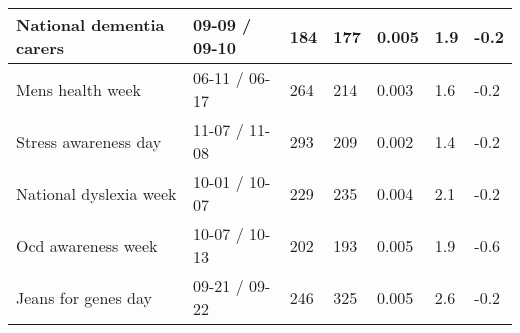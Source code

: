 \begin{tabularx}{\textwidth}{|X|P{2.2cm}|P{1.2cm}|P{1cm}|P{1.4cm}|P{1.2cm}|P{1.3cm}|}
National dementia carers & 09-09 / 09-10 & 184 & 177 & 0.005 & 1.9 & -0.2 \\ \hline
Mens health week & 06-11 / 06-17 & 264 & 214 & 0.003 & 1.6 & -0.2 \\ \hline
Stress awareness day & 11-07 / 11-08 & 293 & 209 & 0.002 & 1.4 & -0.2 \\ \hline
National dyslexia week & 10-01 / 10-07 & 229 & 235 & 0.004 & 2.1 & -0.2 \\ \hline
Ocd awareness week & 10-07 / 10-13 & 202 & 193 & 0.005 & 1.9 & -0.6 \\ \hline
Jeans for genes day & 09-21 / 09-22 & 246 & 325 & 0.005 & 2.6 & -0.2 \\ \hline

\end{tabularx}
